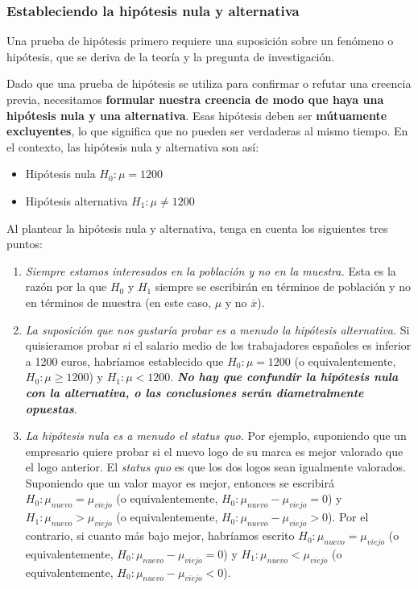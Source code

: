 \documentclass[
]{book}
\providecommand{\tightlist}{%
  \setlength{\itemsep}{0pt}\setlength{\parskip}{0pt}}
\begin{document}
\hypertarget{estableciendo-la-hipuxf3tesis-nula-y-alternativa}{%
\subsubsection{Estableciendo la hipótesis nula y alternativa}\label{estableciendo-la-hipuxf3tesis-nula-y-alternativa}}

Una prueba de hipótesis primero requiere una suposición sobre un fenómeno o hipótesis, que se deriva de la teoría y la pregunta de investigación.

Dado que una prueba de hipótesis se utiliza para confirmar o refutar una creencia previa, necesitamos \textbf{formular nuestra creencia de modo que haya una hipótesis nula y una alternativa}. Esas hipótesis deben ser \textbf{mútuamente excluyentes}, lo que significa que no pueden ser verdaderas al mismo tiempo. En el contexto, las hipótesis nula y alternativa son así:

\begin{itemize}
\tightlist
\item
  Hipótesis nula \(H_0:\mu=1200\)
\item
  Hipótesis alternativa \(H_1:\mu\ne 1200\)
\end{itemize}

Al plantear la hipótesis nula y alternativa, tenga en cuenta los siguientes tres puntos:

\begin{enumerate}
\def\labelenumi{\arabic{enumi}.}
\tightlist
\item
  \emph{Siempre estamos interesados en la población y no en la muestra.} Esta es la razón por la que \(H_0\) y \(H_1\) siempre se escribirán en términos de población y no en términos de muestra (en este caso, \(\mu\) y no \(\overline{x}\)).
\item
  \emph{La suposición que nos gustaría probar es a menudo la hipótesis alternativa.} Si quisieramos probar si el salario medio de los trabajadores españoles es inferior a 1200 euros, habríamos establecido que \(H_0:\mu = 1200\) (o equivalentemente, \(H_0:\mu\ge 1200\)) y \(H_1:\mu<1200\). \textbf{\emph{No hay que confundir la hipótesis nula con la alternativa, o las conclusiones serán diametralmente opuestas}}.
\item
  \emph{La hipótesis nula es a menudo el status quo.} Por ejemplo, suponiendo que un empresario quiere probar si el nuevo logo de su marca es mejor valorado que el logo anterior. El \emph{status quo} es que los dos logos sean igualmente valorados. Suponiendo que un valor mayor es mejor, entonces se escribirá \(H_0:\mu_{nuevo}=\mu_{viejo}\) (o equivalentemente, \(H_0:\mu_{nuevo} - \mu_{viejo} = 0\)) y \(H_1:\mu_{nuevo}>\mu_{viejo}\) (o equivalentemente, \(H_0:\mu_{nuevo} - \mu_{viejo}> 0\)). Por el contrario, si cuanto más bajo mejor, habríamos escrito \(H_0: \mu_{nuevo} = \mu_{viejo}\) (o equivalentemente, \(H_0: \mu_{nuevo} - \mu_{viejo} = 0\)) y \(H_1:\mu_{nuevo} <\mu_{viejo}\) (o equivalentemente, \(H_0: \mu_{nuevo} - \mu_{viejo}<0\)).
\end{enumerate}
\end{document}
